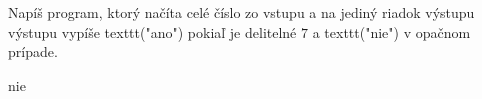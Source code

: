




Napíš program, ktorý načíta celé číslo zo vstupu a na jediný riadok výstupu výstupu vypíše texttt("ano") pokiaľ je delitelné $7$ a texttt("nie") v opačnom prípade.

\vystup
nie
\koniec


